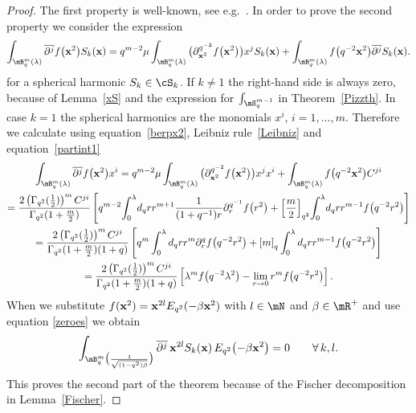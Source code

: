 \begin{proof}
The f\/irst property is well-known, see e.g.~\cite{MR1239953, MR1408120}. In order to prove the second property we consider the expression
\begin{gather*}
\int_{\mB^m_q(\lambda)}\overline{\partial^j}f\big(\bold{x}^2\big)S_k(\bold{x})
=q^{m-2}\mu\int_{\mB^m_q(\lambda)}\big(\partial_{\bold{x}^2}^{q^{-2}}f\big(\bold{x}^2\big)\big)x^j S_k(\bold{x})+\int_{\mB^m_q(\lambda)}f\big(q^{-2}\bold{x}^2\big)\overline{\partial^j}S_k(\bold{x}).
\end{gather*}
for a spherical harmonic $S_k\in\cS_k$. If $k\not=1$ the right-hand side is always zero, because of Lemma~\ref{xS} and the expression for $\int_{\mS^{m-1}_q}$ in Theorem~\ref{Pizzth}. In case $k=1$ the spherical harmonics are the monomials $x^i$, $i=1,\dots,m$. Therefore we calculate using equation~\eqref{berpx2}, Leibniz rule~\eqref{Leibniz} and equation~\eqref{partint1}
\begin{gather*}
\int_{\mB^m_q(\lambda)}\overline{\partial^j}f\big(\bold{x}^2\big)x^i
=q^{m-2}\mu\int_{\mB^m_q(\lambda)}\big(\partial_{\bold{x}^2}^{q^{-2}}f\big(\bold{x}^2\big)\big)x^j x^i+\int_{\mB^m_q(\lambda)}f\big(q^{-2}\bold{x}^2\big)C^{ji}\\
=\frac{2\left(\Gamma_{q^2}(\frac{1}{2})\right)^{m}C^{ji}}{\Gamma_{q^2}(1+\frac{m}{2})}\left[q^{m-2}\!\int_0^\lambda \!d_qr r^{m+1}\frac{1}{(1+q^{-1})r}\partial^{q^{-1}}_rf\big(r^2\big)+\left[\frac{m}{2}\right]_{q^2}\!\int_0^\lambda \! d_qr r^{m-1}f\big(q^{-2}r^2\big)\right]\\
=\frac{2\left(\Gamma_{q^2}(\frac{1}{2})\right)^{m}C^{ji}}{\Gamma_{q^2}(1+\frac{m}{2})(1+q)}\left[q^{m}\int_0^\lambda d_qr r^{m}\partial^q_rf\big(q^{-2}r^2\big)+\left[m\right]_q\int_0^\lambda d_qr r^{m-1}f\big(q^{-2}r^2\big)\right]\\
=\frac{2\left(\Gamma_{q^2}(\frac{1}{2})\right)^{m}C^{ji}}{\Gamma_{q^2}(1+\frac{m}{2})(1+q)}\left[\lambda^mf\big(q^{-2}\lambda^2\big)-\lim_{r\to0}r^m f\big(q^{-2}r^2\big)\right].
\end{gather*}
When we substitute $f(\bold{x}^2)=\bold{x}^{2l}E_{q^2}(-\beta \bold{x}^2)$ with $l\in\mN$ and $\beta\in\mR^+$ and use equation \eqref{zeroes} we obtain
\begin{gather*}
\int_{\mB^m_q\big(\frac{1}{\sqrt{(1-q^2)\beta}}\big)}\overline{\partial^j}\,\bold{x}^{2l}S_k(\bold{x})\,E_{q^2}\big({-}\beta \bold{x}^2\big) = 0\qquad \forall\, k,l.
\end{gather*}
This proves the second part of the theorem because of the Fischer decomposition in Lem\-ma~\ref{Fischer}.
\end{proof}


